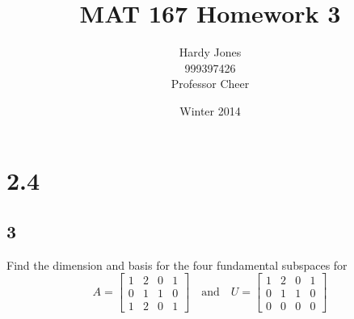 \documentclass[12pt,letterpaper]{article}
\title{MAT 167 Homework 3\vspace{-2ex}}
\author{Hardy Jones\\
        999397426\\
        Professor Cheer\vspace{-2ex}}
\date{Winter 2014}
\begin{document}
  \maketitle

  \section*{2.4}
    \subsection*{3}
      Find the dimension and basis for the four fundamental subspaces for
      \[
        A =
        \begin{bmatrix}
          1 & 2 & 0 & 1 \\
          0 & 1 & 1 & 0 \\
          1 & 2 & 0 & 1
        \end{bmatrix}
        \quad \text{and} \quad
        U =
        \begin{bmatrix}
          1 & 2 & 0 & 1 \\
          0 & 1 & 1 & 0 \\
          0 & 0 & 0 & 0
        \end{bmatrix}
      \]
\end{document}
